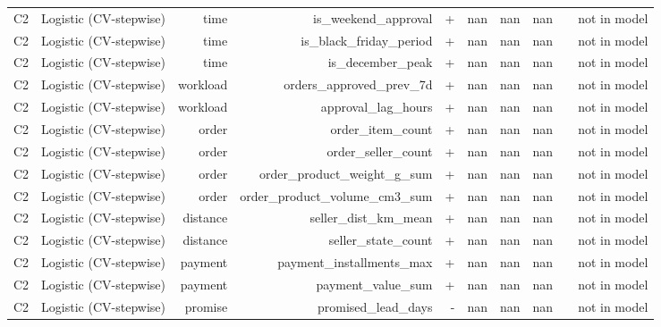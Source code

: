 \begin{table}[htbp]
\begin{tabular}{lrrrrrrrrr}
C2 & Logistic (CV-stepwise) & time & is\_weekend\_approval & + & nan & nan & nan &  & not in model \\
C2 & Logistic (CV-stepwise) & time & is\_black\_friday\_period & + & nan & nan & nan &  & not in model \\
C2 & Logistic (CV-stepwise) & time & is\_december\_peak & + & nan & nan & nan &  & not in model \\
C2 & Logistic (CV-stepwise) & workload & orders\_approved\_prev\_7d & + & nan & nan & nan &  & not in model \\
C2 & Logistic (CV-stepwise) & workload & approval\_lag\_hours & + & nan & nan & nan &  & not in model \\
C2 & Logistic (CV-stepwise) & order & order\_item\_count & + & nan & nan & nan &  & not in model \\
C2 & Logistic (CV-stepwise) & order & order\_seller\_count & + & nan & nan & nan &  & not in model \\
C2 & Logistic (CV-stepwise) & order & order\_product\_weight\_g\_sum & + & nan & nan & nan &  & not in model \\
C2 & Logistic (CV-stepwise) & order & order\_product\_volume\_cm3\_sum & + & nan & nan & nan &  & not in model \\
C2 & Logistic (CV-stepwise) & distance & seller\_dist\_km\_mean & + & nan & nan & nan &  & not in model \\
C2 & Logistic (CV-stepwise) & distance & seller\_state\_count & + & nan & nan & nan &  & not in model \\
C2 & Logistic (CV-stepwise) & payment & payment\_installments\_max & + & nan & nan & nan &  & not in model \\
C2 & Logistic (CV-stepwise) & payment & payment\_value\_sum & + & nan & nan & nan &  & not in model \\
C2 & Logistic (CV-stepwise) & promise & promised\_lead\_days & - & nan & nan & nan &  & not in model \\
\bottomrule
\end{tabular}
\par\smallskip\begin{minipage}{\linewidth}\footnotesize \end{minipage}
\end{table}


